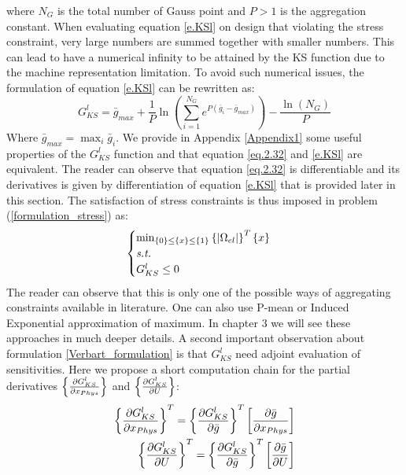 where $N_G$  is the total number of Gauss point and $P>1$ is the aggregation constant. When evaluating equation \eqref{e.KSl} on design that violating the stress constraint, very large numbers are summed together with smaller numbers. This can lead to have a numerical infinity to be attained by the KS function due to the machine representation limitation.
To avoid such numerical issues, the formulation of equation \eqref{e.KSl} can be rewritten as:
\begin{equation}
\label{eq.2.32}
G^{l}_{KS}=\bar{g}_{max}+\frac{1}{P}\ln\left(\sum_{i=1}^{N_G}e^{P\left(\bar{g}_i-\bar{g}_{max}\right)}\right)-\frac{\ln\left(N_G\right)}{P}
\end{equation}
Where $\bar{g}_{max}=\max_i\bar{g}_i$. We provide in Appendix \ref{Appendix1} some useful properties of the $G_{KS}^l$ function and that equation \eqref{eq.2.32} and \eqref{e.KSl} are equivalent. The reader can observe that equation \eqref{eq.2.32} is differentiable and its derivatives is given by differentiation of equation \eqref{e.KSl} that is provided later in this section. 
The satisfaction of stress constraints is thus imposed in problem (\ref{formulation_stress}) as:
\begin{equation}
\begin{cases}
\label{Verbart_formulation}
\min_{\left\lbrace{0}\right \rbrace\leq\left\lbrace{x}\right \rbrace\leq\left\lbrace{1}\right \rbrace} {\left\lbrace{|\Omega_{el}|}\right \rbrace^T\left\lbrace{x}\right \rbrace} \\
\textit{s.t.}\\
G^{l}_{KS}\leq 0 
\end{cases}
\end{equation}
The reader can observe that this is only one of the possible ways of aggregating constraints available in literature.  One can also use P-mean \cite{duysinx1998new} or Induced Exponential \cite{kennedy2015improved} approximation of maximum. In chapter 3 we will see these approaches in much deeper details.
A second important observation about formulation \ref{Verbart_formulation} is that $G^{l}_{KS}$ need adjoint evaluation of sensitivities. Here we propose a short computation chain for the partial derivatives $\left\lbrace{\frac{\partial G_{KS}^l}{\partial x_{Phys}}}\right \rbrace$ and  $\left\lbrace{\frac{\partial G_{KS}^l}{\partial U}}\right \rbrace$:
\begin{eqnarray}
\left\lbrace{\frac{\partial G_{KS}^l}{\partial x_{Phys}}}\right \rbrace^T=\left\lbrace{\frac{\partial G_{KS}^l}{\partial \bar{g}}}\right \rbrace^T\left[{\frac{\partial  \bar{g}}{\partial x_{Phys}}}\right]\\
\left\lbrace{\frac{\partial G_{KS}^l}{\partial U}}\right \rbrace^T=\left\lbrace{\frac{\partial G_{KS}^l}{\partial \bar{g}}}\right \rbrace^T\left[{\frac{\partial  \bar{g}}{\partial U}}\right]
\end{eqnarray}
